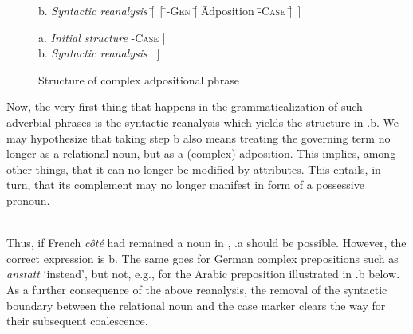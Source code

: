 \begin{figure}
	\begin{tabbing}
		b. \hspace{.75cm} \= \textit{Syntactic reanalysis} \hspace{1cm} \= [~[ \= \np-\textsc{Gen} \= [ \= Adposition \= -\textsc{Case} \= ]~]\kill
		
		a.	\>	\textit{Initial structure}	\> [~[ \>  \np-\textsc{Gen} \> \>  N\textsubscript{rel} ] \>  {}-\textsc{Case} \> ] \\
		b. \> \textit{Syntactic reanalysis} \> [ \> \np-\textsc{Gen} \> [ \> Adposition \> -\textsc{Case} \> ]~]
	\end{tabbing}
	\caption{Structure of complex adpositional phrase} \label{fig:structureadpos}
\end{figure}

\noindent Now, the very first thing that happens in the grammaticalization of such adverbial phrases is the syntactic reanalysis which yields the structure in .b. We may hypothesize that taking step b also means treating the governing term no longer as a relational noun, but as a (complex) adposition. This implies, among other things, that it can no longer be modified by attributes. This entails, in turn, that its complement may no longer manifest in form of a possessive pronoun.

\ea\label{ex:E53}
\langinfo{\LangFren}{}{} \\
 \z
\z
\newpage
\noindent Thus, if French \textit{côté} had remained a noun in , .a should be possible. However, the correct expression is b. The same goes for German complex prepositions such as \textit{anstatt} ‘instead’, but not, e.g., for the Arabic preposition illustrated in .b below. As a further consequence of the above reanalysis, the removal of the syntactic boundary between the relational noun and the case marker clears the way for their subsequent coalescence.


